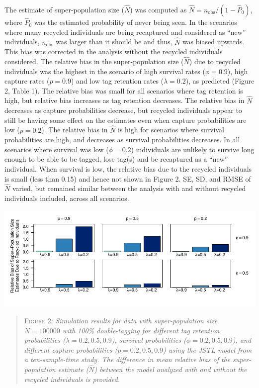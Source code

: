 \documentclass[]{article}
\begin{document}
The estimate of super-population size (\(\hat{N}\)) was computed as
\(\hat{N}=n_{\text{obs}}/{(1-\hat{P}_0)}\), where \(\hat{P}_0\) was the
estimated probability of never being seen. In the scenarios where many
recycled individuals are being recaptured and considered as ``new''
individuals, \(n_{\text{obs}}\) was larger than it should be and thus,
\(\hat{N}\) was biased upwards. This bias was corrected in the analysis
without the recycled individuals considered. The relative bias in the
super-population size (\(\hat{N}\)) due to recycled individuals was the
highest in the scenario of high survival rates (\(\phi=0.9\)), high
capture rates (\(p=0.9\)) and low tag retention rates (\(\lambda=0.2\)),
as predicted (Figure 2, Table 1). The relative bias was small for all
scenarios where tag retention is high, but relative bias increases as
tag retention decreases. The relative bias in \(\hat{N}\) decreases as
capture probabilities decrease, but recycled individuals appear to still
be having some effect on the estimates even when capture probabilities
are low (\(p=0.2\)). The relative bias in \(\hat{N}\) is high for
scenarios where survival probabilities are high, and decreases as
survival probabilities decreases. In all scenarios where survival was
low (\(\phi=0.2\)) individuals are unlikely to survive long enough to be
able to be tagged, lose tag(s) and be recaptured as a ``new''
individual. When survival is low, the relative bias due to the recycled
individuals is small (less than 0.15) and hence not shown in Figure 2.
SE, SD, and RMSE of \(\hat{N}\) varied, but remained similar between the
analysis with and without recycled individuals included, across all
scenarios.

\includegraphics{RecycledPaper_files/figure-latex/Figure2_N-1.pdf}

\begin{quote}
\textsc{Figure 2:}
\textsl{Simulation results for data with super-population size $N=100 000$ with 100\% double-tagging for different tag retention probabilities ($\lambda=0.2,0.5,0.9$), survival probabilities ($\phi=0.2,0.5,0.9$), and different capture probabilities ($p=0.2,0.5,0.9$) using the JSTL model from a ten-sample-time study. The difference in mean relative bias of the super-population estimate ($\hat{N}$) between the model analyzed with and without the recycled individuals is provided.}
\end{quote}
\end{document}
